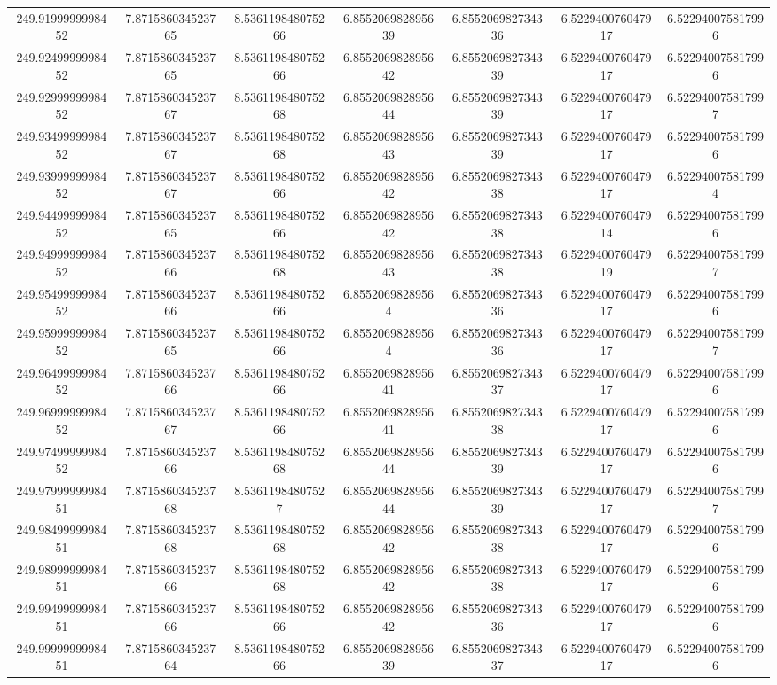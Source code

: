 \begin{center}
{\begin{tabular}{| c | c | c | c | c | c | c |}
249.9199999998452  & 7.871586034523765  & 8.536119848075266  & 6.855206982895639  & 6.855206982734336  & 6.522940076047917  & 6.522940075817996 \\
249.9249999998452  & 7.871586034523765  & 8.536119848075266  & 6.855206982895642  & 6.855206982734339  & 6.522940076047917  & 6.522940075817996 \\
249.9299999998452  & 7.871586034523767  & 8.536119848075268  & 6.855206982895644  & 6.855206982734339  & 6.522940076047917  & 6.522940075817997 \\
249.9349999998452  & 7.871586034523767  & 8.536119848075268  & 6.855206982895643  & 6.855206982734339  & 6.522940076047917  & 6.522940075817996 \\
249.9399999998452  & 7.871586034523767  & 8.536119848075266  & 6.855206982895642  & 6.855206982734338  & 6.522940076047917  & 6.522940075817994 \\
249.9449999998452  & 7.871586034523765  & 8.536119848075266  & 6.855206982895642  & 6.855206982734338  & 6.522940076047914  & 6.522940075817996 \\
249.9499999998452  & 7.871586034523766  & 8.536119848075268  & 6.855206982895643  & 6.855206982734338  & 6.522940076047919  & 6.522940075817997 \\
249.9549999998452  & 7.871586034523766  & 8.536119848075266  & 6.85520698289564  & 6.855206982734336  & 6.522940076047917  & 6.522940075817996 \\
249.9599999998452  & 7.871586034523765  & 8.536119848075266  & 6.85520698289564  & 6.855206982734336  & 6.522940076047917  & 6.522940075817997 \\
249.9649999998452  & 7.871586034523766  & 8.536119848075266  & 6.855206982895641  & 6.855206982734337  & 6.522940076047917  & 6.522940075817996 \\
249.9699999998452  & 7.871586034523767  & 8.536119848075266  & 6.855206982895641  & 6.855206982734338  & 6.522940076047917  & 6.522940075817996 \\
249.9749999998452  & 7.871586034523766  & 8.536119848075268  & 6.855206982895644  & 6.855206982734339  & 6.522940076047917  & 6.522940075817996 \\
249.9799999998451  & 7.871586034523768  & 8.53611984807527  & 6.855206982895644  & 6.855206982734339  & 6.522940076047917  & 6.522940075817997 \\
249.9849999998451  & 7.871586034523768  & 8.536119848075268  & 6.855206982895642  & 6.855206982734338  & 6.522940076047917  & 6.522940075817996 \\
249.9899999998451  & 7.871586034523766  & 8.536119848075268  & 6.855206982895642  & 6.855206982734338  & 6.522940076047917  & 6.522940075817996 \\
249.9949999998451  & 7.871586034523766  & 8.536119848075266  & 6.855206982895642  & 6.855206982734336  & 6.522940076047917  & 6.522940075817996 \\
249.9999999998451  & 7.871586034523764  & 8.536119848075266  & 6.855206982895639  & 6.855206982734337  & 6.522940076047917  & 6.522940075817996 \\
\hline
\end{tabular}
}
\end{center}
